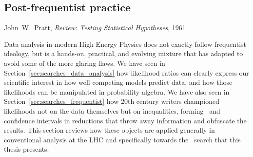\begin{singlespacing}
\section{Post-frequentist practice}
\label{sec:searches_practice}
\begin{epigraphs}
%
{John~W.~Pratt,
\textit{Review: Testing Statistical Hypotheses},
1961~\cite{pratt1961testing}}
\end{epigraphs}
\end{singlespacing}

Data analysis in modern High Energy Physics does not exactly follow frequentist
ideology, but is a hands-on, practical, and evolving mixture that has adapted
to avoid some of the more glaring flaws.
We have seen in Section~\ref{sec:searches_data_analysis} how likelihood ratios
can clearly express our scientific interest in how well competing models
predict data, and how those likelihoods can be manipulated in probability
algebra.
We have also seen in Section~\ref{sec:searches_frequentist} how 20th century
writers championed likelihoods not on the data themselves but on inequalities,
forming \pvalues\ and confidence intervals in reductions that throw away
information and obfuscate the results.
This section reviews how these objects are applied generally in conventional
analysis at the LHC and specifically towards the \atlas\ search that this
thesis presents.

